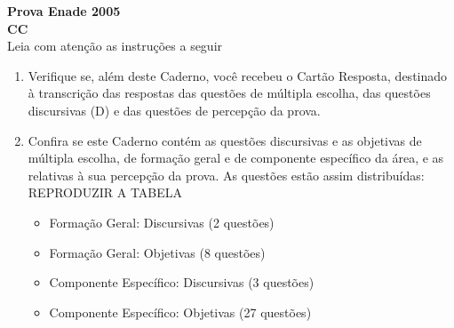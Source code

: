 \documentclass{exam}
\begin{document}
\begin{center}
\vspace*{1cm}
\LARGE \textbf{Prova Enade 2005\\CC \\}\vspace*{0.5cm}
\Large Leia com atenção as instruções a seguir
\vspace*{0.5cm}
\end{center}

\begin{enumerate}
    \item Verifique se, além deste Caderno, você recebeu o Cartão Resposta, destinado à transcrição das respostas das questões de múltipla escolha, das questões discursivas (D) e das questões de percepção da prova.
    \item Confira se este Caderno contém as questões discursivas e as objetivas de múltipla escolha, de formação geral e de componente específico da área, e as relativas à sua percepção da prova. As questões estão assim distribuídas:
REPRODUZIR A TABELA
    \begin{itemize}

        \item Formação Geral: Discursivas (2 questões)\\
        \item Formação Geral: Objetivas  (8 questões)\\
        \item Componente Específico: Discursivas (3 questões)\\
        \item Componente Específico: Objetivas (27 questões)\\
    \end{itemize}


\end{enumerate}
\end{document}
